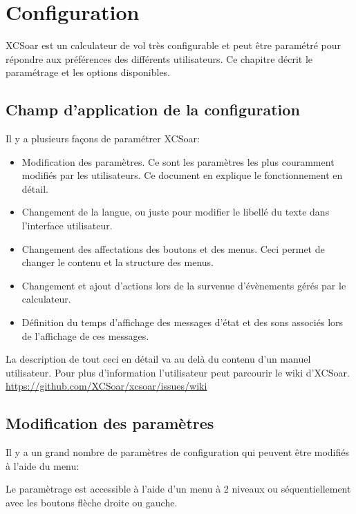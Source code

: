 \chapter{Configuration}\label{cha:configuration}
XCSoar est un calculateur de vol très configurable et peut être paramétré pour répondre aux préférences des différents utilisateurs. Ce chapitre décrit le paramétrage et les options disponibles.

\section{Champ d'application de la configuration}
Il y a plusieurs façons de paramétrer XCSoar:
\begin{itemize}

\item Modification des paramètres. Ce sont les paramètres les plus couramment modifiés par les utilisateurs. Ce document en explique le fonctionnement en détail.
\item Changement de la langue, ou juste pour modifier le libellé du texte dans l'interface utilisateur.
\item Changement des affectations des boutons et des menus. Ceci permet de changer le contenu et la structure des menus.
\item Changement et ajout d'actions lors de la survenue d'évènements gérés par le calculateur.
\item Définition du temps d'affichage des messages d'état et des sons associés lors de l'affichage de ces messages.
\end{itemize}
La description de tout ceci en détail va au delà du contenu d'un manuel utilisateur. Pour plus d'information l'utilisateur peut parcourir le wiki d'XCSoar. \url{https://github.com/XCSoar/xcsoar/issues/wiki}

\section{Modification des paramètres}

Il y a un grand nombre de paramètres de configuration qui peuvent être modifiés à l'aide du menu:
\begin{quote}
\blink{}
\end{quote}
Le paramètrage est accessible à l'aide d'un menu à 2 niveaux ou séquentiellement avec les boutons flèche droite ou gauche.

